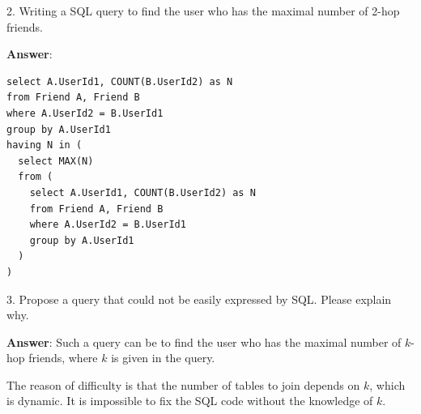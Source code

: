 \documentclass{article}
\begin{document}
2. Writing a SQL query to find the user who has the maximal number of 2-hop friends.

{\bf Answer}:
\begin{verbatim}
select A.UserId1, COUNT(B.UserId2) as N
from Friend A, Friend B
where A.UserId2 = B.UserId1
group by A.UserId1
having N in (
  select MAX(N)
  from (
    select A.UserId1, COUNT(B.UserId2) as N
    from Friend A, Friend B
    where A.UserId2 = B.UserId1
    group by A.UserId1
  )
)
\end{verbatim}

3. Propose a query that could not be easily expressed by SQL. Please explain why.

{\bf Answer}:
Such a query can be to find the user who has the maximal number of $k$-hop friends, where $k$ is given in the query.

The reason of difficulty is that the number of tables to join depends on $k$, which is dynamic. It is impossible to fix the SQL code without the knowledge of $k$.
\end{document}

